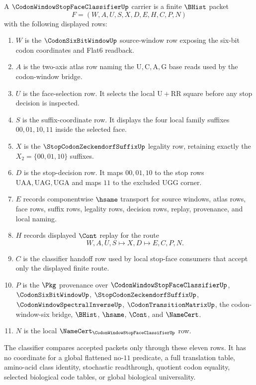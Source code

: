 \begin{definition}
\label{def:codon-window-stop-face-classifier-carrier}
A $\CodonWindowStopFaceClassifierUp$ carrier is a finite $\BHist$ packet
$$
F=(W,A,U,S,X,D,E,H,C,P,N)
$$
with the following displayed rows:
\begin{enumerate}
\item $W$ is the $\CodonSixBitWindowUp$ source-window row exposing the six-bit codon coordinates and Flat6 readback.
\item $A$ is the two-axis atlas row naming the $\mathrm{U},\mathrm{C},\mathrm{A},\mathrm{G}$ base reads used by the codon-window bridge.
\item $U$ is the face-selection row. It selects the local $\mathrm{U}+\mathrm{RR}$ square before any stop decision is inspected.
\item $S$ is the suffix-coordinate row. It displays the four local family suffixes $00,01,10,11$ inside the selected face.
\item $X$ is the $\StopCodonZeckendorfSuffixUp$ legality row, retaining exactly the $X_{2}=\{00,01,10\}$ suffixes.
\item $D$ is the stop-decision row. It maps $00,01,10$ to the stop rows $\mathrm{UAA},\mathrm{UAG},\mathrm{UGA}$ and maps $11$ to the excluded $\mathrm{UGG}$ corner.
\item $E$ records componentwise $\hsame$ transport for source windows, atlas rows, face rows, suffix rows, legality rows, decision rows, replay, provenance, and local naming.
\item $H$ records displayed $\Cont$ replay for the route
$$
W,A,U,S \longmapsto X,D \longmapsto E,C,P,N .
$$
\item $C$ is the classifier handoff row used by local stop-face consumers that accept only the displayed finite route.
\item $P$ is the $\Pkg$ provenance over $\CodonWindowStopFaceClassifierUp$, $\CodonSixBitWindowUp$, $\StopCodonZeckendorfSuffixUp$, $\CodonWindowSpectralInverseUp$, $\CodonTransitionMatrixUp$, the codon-window-six bridge, $\BHist$, $\hsame$, $\Cont$, and $\NameCert$.
\item $N$ is the local $\NameCert_{\CodonWindowStopFaceClassifierUp}$ row.
\end{enumerate}
The classifier compares accepted packets only through these eleven rows. It has no coordinate for a global flattened no-$11$ predicate, a full translation table, amino-acid class identity, stochastic readthrough, quotient codon equality, selected biological code tables, or global biological universality.
\end{definition}

